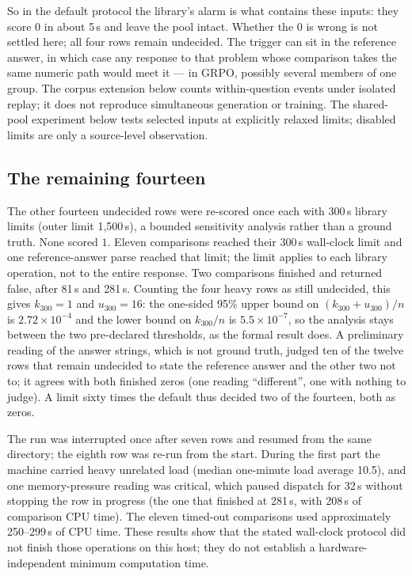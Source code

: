 \documentclass[10pt,a4paper]{article}
\begin{document}
So in the default protocol the library's alarm is what contains these
inputs: they score $0$ in about 5\,s and leave the pool intact. Whether the
0 is wrong is not settled here; all four rows remain undecided. The trigger can sit in the reference answer, in which case any
response to that problem whose comparison takes the same numeric path would
meet it --- in GRPO, possibly several members of one group. The corpus
extension below counts within-question events under isolated replay; it does
not reproduce simultaneous generation or training. The shared-pool experiment
below tests selected inputs at explicitly relaxed limits; disabled limits
are only a source-level observation.

\subsection{The remaining fourteen}
The other fourteen undecided rows were re-scored once each with 300\,s
library limits (outer limit 1,500\,s), a bounded sensitivity analysis rather
than a ground truth. None scored $1$. Eleven comparisons reached their
300\,s wall-clock limit and one reference-answer parse reached that limit;
the limit applies to each library operation, not to the entire response.
Two comparisons
finished and returned false, after 81\,s and 281\,s. Counting the four heavy
rows as still undecided, this gives $k_{300}=1$ and $u_{300}=16$: the one-sided
95\% upper bound on $(k_{300}+u_{300})/n$ is $2.72\times10^{-4}$ and the
lower bound on $k_{300}/n$ is $5.5\times10^{-7}$, so the analysis stays between
the two pre-declared thresholds, as the formal result does. A preliminary
reading of the answer strings, which is not ground truth, judged ten of the twelve rows that
remain undecided to state the reference answer and the other two not to; it
agrees with both finished zeros (one reading ``different'', one with nothing
to judge). A limit sixty times the default thus decided two of the fourteen,
both as zeros.

The run was interrupted once after seven rows and resumed
from the same directory; the eighth row was re-run from the start. During the
first part the machine carried heavy unrelated load (median one-minute load
average 10.5), and one memory-pressure reading was critical, which paused
dispatch for 32\,s without stopping the row in progress (the one that
finished at 281\,s, with 208\,s of comparison CPU time). The eleven
timed-out comparisons used approximately 250--299\,s of CPU time. These
results show that the stated wall-clock protocol did not finish those
operations on this host; they do not establish a hardware-independent
minimum computation time.
\end{document}
